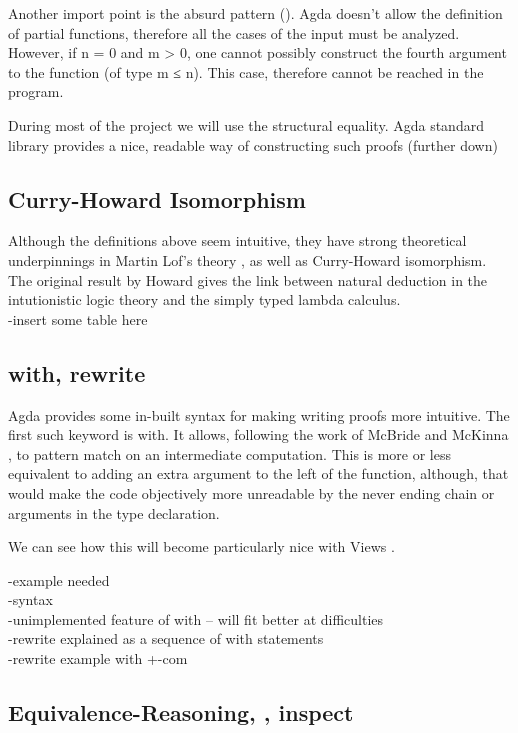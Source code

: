 \documentclass[12pt,twoside,notitlepage]{report}
\begin{document}
Another import point is the absurd pattern (). Agda doesn't allow the definition of partial functions, therefore all the cases of the
input must be analyzed. However, if n = 0 and m > 0, one cannot possibly construct the fourth argument to the function (of type m ≤ n). This case,
therefore cannot be reached in the program.

During most of the project we will use the structural equality. Agda standard library provides a nice, readable way
of constructing such proofs (further down)

\subsection{Curry-Howard Isomorphism}

Although the definitions above seem intuitive, they have strong theoretical underpinnings in Martin Lof's theory \cite{martinlof}, as well as
Curry-Howard isomorphism. The original result by Howard \cite{howard} gives the link between natural deduction in the intutionistic logic theory
and the simply typed lambda calculus. \\
-insert some table here \\

\subsection{with, rewrite}

Agda provides some in-built syntax for making writing proofs more intuitive.
The first such keyword is with. It allows, following the work of McBride and McKinna \cite{viewfromtheleft},
to pattern match on an intermediate computation. This is more or less equivalent to adding an extra argument to
the left of the function, although, that would make the code objectively more unreadable by the never ending
chain or arguments in the type declaration.

We can see how this will become particularly nice with Views \cite{wadler}.

-example needed\\
-syntax\\
-unimplemented feature of with -- will fit better at difficulties\\
-rewrite explained as a sequence of with statements\\
-rewrite example with +-com


\subsection{Equivalence-Reasoning, , inspect}
\end{document}
